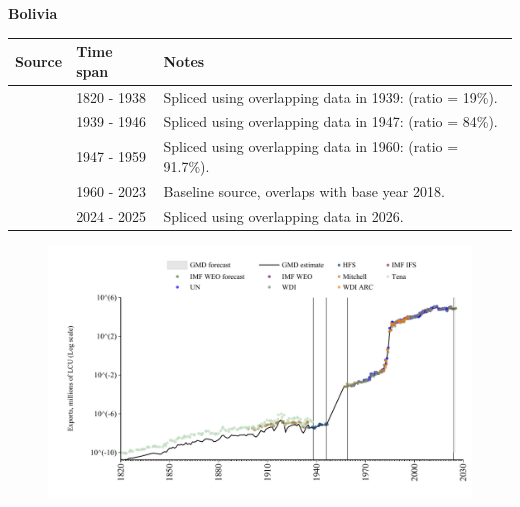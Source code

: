 \documentclass[12pt,a4paper,landscape]{article}
\begin{document}
\begin{adjustbox}{max totalsize={\paperwidth}{\paperheight},center}
\begin{minipage}[t][\textheight][t]{\textwidth}
\vspace*{0.5cm}
{}
\begin{center}
{\Large\bfseries Bolivia}
\end{center}
\vspace{0.5cm}
\begin{table}[H]
\centering
\small
\begin{tabular}{|l|l|l|}
\hline
\textbf{Source} & \textbf{Time span} & \textbf{Notes} \\
\hline
\rowcolor{white}\cite{Tena}& 1820 - 1938 &Spliced using overlapping data in 1939: (ratio = 19\%).\\
\rowcolor{lightgray}\cite{HFS}& 1939 - 1946 &Spliced using overlapping data in 1947: (ratio = 84\%).\\
\rowcolor{white}\cite{Mitchell}& 1947 - 1959 &Spliced using overlapping data in 1960: (ratio = 91.7\%).\\
\rowcolor{lightgray}\cite{WDI}& 1960 - 2023 &Baseline source, overlaps with base year 2018.\\
\rowcolor{white}\cite{IMF_WEO_forecast}& 2024 - 2025 &Spliced using overlapping data in 2026.\\
\hline
\end{tabular}
\end{table}
\begin{figure}[H]
\centering
\includegraphics[width=\textwidth,height=0.6\textheight,keepaspectratio]{graphs/BOL_exports.pdf}
\end{figure}
\end{minipage}
\end{adjustbox}
\end{document}
